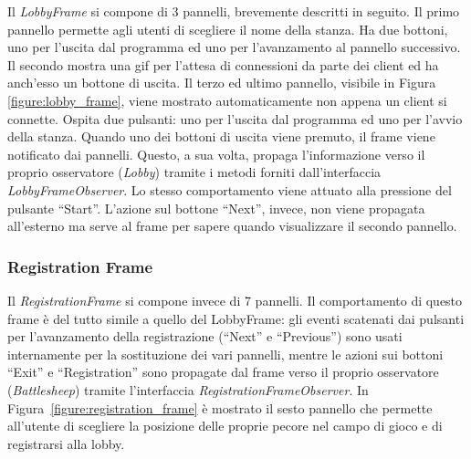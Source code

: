 Il \textit{LobbyFrame} si compone di 3 pannelli, brevemente descritti in seguito. Il primo
pannello permette agli utenti di scegliere il nome della stanza. Ha due bottoni,
uno per l'uscita dal programma ed uno per l'avanzamento al pannello successivo.
Il secondo mostra una gif per l'attesa di connessioni da parte dei client ed ha
anch'esso un bottone di uscita. Il terzo ed ultimo pannello, visibile in Figura
\ref{figure:lobby_frame}, viene mostrato automaticamente non appena un client si
connette. Ospita due pulsanti: uno per l'uscita dal programma ed uno per l'avvio
della stanza.\newline
Quando uno dei bottoni di uscita viene premuto, il frame viene notificato dai pannelli.
Questo, a sua volta, propaga
l'informazione verso il proprio osservatore (\textit{Lobby}) tramite i metodi
forniti dall'interfaccia \textit{LobbyFrameObserver}. Lo stesso comportamento
viene attuato alla pressione del pulsante ``Start''. L'azione sul bottone
``Next'', invece, non viene propagata all'esterno ma serve al frame per sapere
quando visualizzare il secondo pannello.



\subsubsection{Registration Frame}
Il \textit{RegistrationFrame} si compone invece di 7 pannelli.\newline
Il comportamento di questo frame è del tutto simile a quello del LobbyFrame: gli
eventi scatenati dai pulsanti per l'avanzamento della registrazione (``Next'' e
``Previous'') sono usati internamente per la sostituzione dei vari pannelli,
mentre le azioni sui bottoni ``Exit'' e ``Registration'' sono propagate dal
frame verso il proprio osservatore (\textit{Battlesheep}) tramite l'interfaccia
\textit{RegistrationFrameObserver}.\newline
In Figura~\ref{figure:registration_frame} è mostrato il sesto pannello che
permette all'utente di scegliere la posizione delle proprie pecore nel campo di
gioco e di registrarsi alla lobby.



